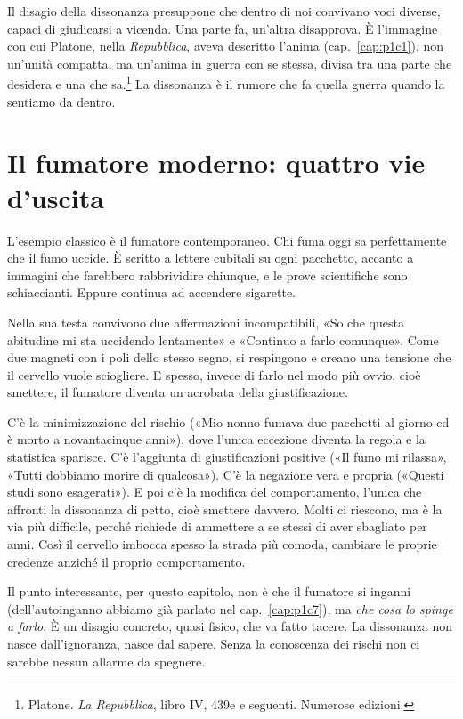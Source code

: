 Il disagio della dissonanza presuppone che dentro di noi convivano voci diverse, capaci di giudicarsi a vicenda. Una parte fa, un'altra disapprova. È l'immagine con cui Platone, nella \textit{Repubblica}, aveva descritto l'anima (cap.~\ref{cap:p1c1}), non un'unità compatta, ma un'anima in guerra con se stessa, divisa tra una parte che desidera e una che sa.\footnote{Platone. \textit{La Repubblica}, libro IV, 439e e seguenti. Numerose edizioni.} La dissonanza è il rumore che fa quella guerra quando la sentiamo da dentro.

\section{Il fumatore moderno: quattro vie d'uscita}

L'esempio classico è il fumatore contemporaneo. Chi fuma oggi sa perfettamente che il fumo uccide. È scritto a lettere cubitali su ogni pacchetto, accanto a immagini che farebbero rabbrividire chiunque, e le prove scientifiche sono schiaccianti. Eppure continua ad accendere sigarette.

Nella sua testa convivono due affermazioni incompatibili, «So che questa abitudine mi sta uccidendo lentamente» e «Continuo a farlo comunque». Come due magneti con i poli dello stesso segno, si respingono e creano una tensione che il cervello vuole sciogliere. E spesso, invece di farlo nel modo più ovvio, cioè smettere, il fumatore diventa un acrobata della giustificazione.

C'è la minimizzazione del rischio («Mio nonno fumava due pacchetti al giorno ed è morto a novantacinque anni»), dove l'unica eccezione diventa la regola e la statistica sparisce. C'è l'aggiunta di giustificazioni positive («Il fumo mi rilassa», «Tutti dobbiamo morire di qualcosa»). C'è la negazione vera e propria («Questi studi sono esagerati»). E poi c'è la modifica del comportamento, l'unica che affronti la dissonanza di petto, cioè smettere davvero. Molti ci riescono, ma è la via più difficile, perché richiede di ammettere a se stessi di aver sbagliato per anni. Così il cervello imbocca spesso la strada più comoda, cambiare le proprie credenze anziché il proprio comportamento.

Il punto interessante, per questo capitolo, non è che il fumatore si inganni (dell'autoinganno abbiamo già parlato nel cap.~\ref{cap:p1c7}), ma \textit{che cosa lo spinge a farlo}. È un disagio concreto, quasi fisico, che va fatto tacere. La dissonanza non nasce dall'ignoranza, nasce dal sapere. Senza la conoscenza dei rischi non ci sarebbe nessun allarme da spegnere.

